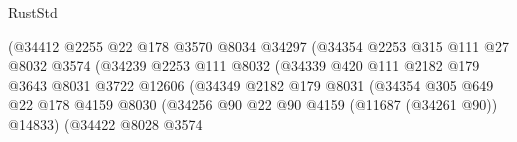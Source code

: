 \begin{lexlean}{RustStd}
\begin{coremodule}
                                        (@34412
                                          @2255
                                          @22
                                          @178
                                          @3570
                                          @8034
                                          @34297
                                          (@34354
                                            @2253
                                            @315
                                            @111
                                            @27
                                            @8032
                                            @3574
                                            (@34239
                                              @2253
                                              @111
                                              @8032
                                              (@34339
                                                @420
                                                @111
                                                @2182
                                                @179
                                                @3643
                                                @8031
                                                @3722
                                                @12606
                                                (@34349
                                                  @2182
                                                  @179
                                                  @8031
                                                  (@34354
                                                    @305
                                                    @649
                                                    @22
                                                    @178
                                                    @4159
                                                    @8030
                                                    (@34256
                                                      @90
                                                      @22
                                                      @90
                                                      @4159
                                                      (@11687 (@34261 @90))
                                                      @14833)
                                                    (@34422
                                                      @8028
                                                      @3574

\end{coremodule}
\end{lexlean}

